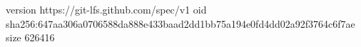 version https://git-lfs.github.com/spec/v1
oid sha256:647aa306a0706588da888e433baad2dd1bb75a194e0fd4dd02a92f3764c6f7ae
size 626416
